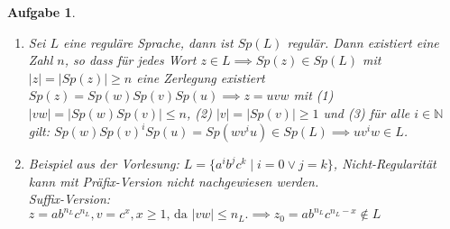 \documentclass[11pt]{article}
\theoremstyle{break}
\newtheorem{task}{Aufgabe}
\newcommand{\set}[1]{\ensuremath{\{#1\}}}
\newcommand{\abs}[1]{\ensuremath{\left\vert #1 \right\vert}}
\begin{document}
\begin{task}
    \hfill\vspace{-5mm}
    \begin{enumerate}[label={(\alph*)}]
        \item Sei $L$ eine reguläre Sprache, dann ist $Sp(L)$ regulär. Dann existiert eine Zahl $n$, so dass für jedes Wort $z\in L \implies Sp(z) \in Sp(L)$ mit $\abs{z} = \abs{Sp(z)} \geq n$ eine Zerlegung existiert $Sp(z) = Sp(w) Sp(v) Sp(u) \implies z=uvw$ mit (1) $\abs{vw} = \abs{Sp(w) Sp(v)} \leq n$, (2) $\abs{v} = \abs{Sp(v)} \geq 1$ und (3) für alle $i\in \mathbb{N}$ gilt: $Sp(w)Sp(v)^i Sp(u) = Sp(wv^iu) \in Sp(L) \implies uv^iw\in L$.
        \item Beispiel aus der Vorlesung: $L = \set{a^i b^j c^k\mid i=0 \lor j=k}$, Nicht-Regularität kann mit Präfix-Version nicht nachgewiesen werden.\\
        Suffix-Version: $z = ab^{n_L}c^{n_L}, v = c^x, x\geq 1\text{, da } \abs{vw}\leq n_L.\implies z_0 = ab^{n_L}c^{n_L - x}\notin L$        
    \end{enumerate}
\end{task}
\end{document}
